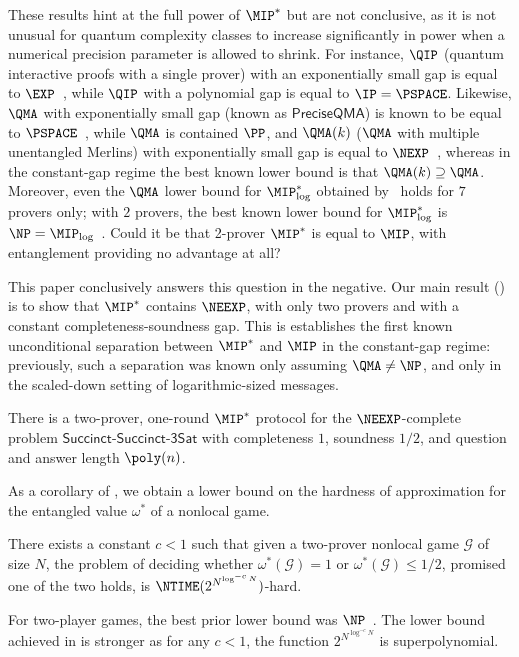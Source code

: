 \documentclass[11pt]{article}
\newcommand{\succinctsquared}{\mathsf{Succinct}\text{-}\mathsf{Succinct}\text{-}\mathsf{3Sat}}
\newcommand{\game}{\mathscr{G}}
\begin{document}
These results hint at the full power of $\MIP^*$ but are not
conclusive, as it is not unusual for quantum complexity classes to
increase significantly in power when a numerical precision parameter
is allowed to shrink. For instance, $\QIP$ (quantum interactive proofs
with a single prover) with an exponentially small
gap is equal to $\EXP$~\cite{IKW12}, while $\QIP$ with a polynomial gap is equal to
$\IP = \PSPACE$. Likewise, $\QMA$ with exponentially small
gap (known as $\mathsf{PreciseQMA}$) is known to be equal to
$\PSPACE$~\cite{FL18}, while $\QMA$ is contained $\PP$, and $\QMA(k)$
($\QMA$ with multiple unentangled Merlins) with exponentially small gap is
equal to $\NEXP$~\cite{Per12}, whereas in the constant-gap
regime the best known lower bound is that
$\QMA(k) \supseteq \QMA$. Moreover, even the $\QMA$ lower bound for
$\MIP^*_{\log}$ obtained by~\cite{NV18b} holds for $7$ provers only;
with $2$ provers, the best known lower bound for $\MIP^*_{\log}$ is
$\NP = \MIP_{\log}$~\cite{NV18a}. Could it be that 2-prover $\MIP^*$ is
equal to $\MIP$, with entanglement providing no advantage at all?

This paper conclusively answers this question in the negative. Our main result () is to show that $\MIP^*$ contains $\NEEXP$, with only
two provers and with a constant completeness-soundness gap. This is
establishes the first known unconditional separation between $\MIP^*$
and $\MIP$ in the constant-gap regime: previously, such a separation
was known only assuming $\QMA \neq \NP$, and only in the scaled-down
setting of logarithmic-sized messages.

\begin{theorem}
  \label{thm:main-informal}
  There is a two-prover, one-round $\MIP^*$ protocol for the $\NEEXP$-complete
  problem $\succinctsquared$ with completeness $1$, soundness $1/2$, and
  question and answer length $\poly(n)$.
\end{theorem}

As a corollary of , we obtain a lower bound on the hardness
of approximation for the entangled value $\omega^*$ of a nonlocal game.
\begin{corollary}\label{cor:main-games-informal}
  There exists a constant $c < 1$ such that given a two-prover
  nonlocal game $\game$ of size $N$, the problem of deciding
  whether $\omega^*(\game) = 1$ or $\omega^*(\game) \leq 1/2$,
  promised one of the two holds, is $\NTIME(2^{N^{\log^{-c} N}})$-hard.
\end{corollary}
For two-player games, the best prior lower bound was
$\NP$~\cite{NV18b}. The lower bound achieved in
 is
stronger as for any $c < 1$, the function $2^{N^{\log^{-c} N}}$ is
superpolynomial.
\end{document}
